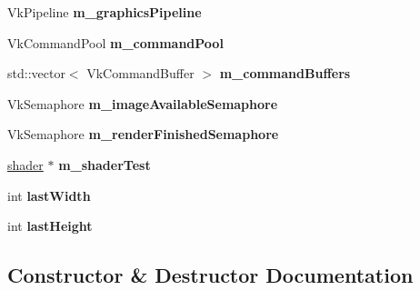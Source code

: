 \begin{DoxyCompactItemize}
\item 
\mbox{\label{classflounder_1_1renderer_a854dc575c2adf3a0f769d1945c7dbde5}} 
Vk\+Pipeline {\bfseries m\+\_\+graphics\+Pipeline}
\item 
\mbox{\label{classflounder_1_1renderer_aa7064e58cdca2627dfea4eb807c0a8b8}} 
Vk\+Command\+Pool {\bfseries m\+\_\+command\+Pool}
\item 
\mbox{\label{classflounder_1_1renderer_a1b4a42cf9601b7c5085d2f00ac73f4ab}} 
std\+::vector$<$ Vk\+Command\+Buffer $>$ {\bfseries m\+\_\+command\+Buffers}
\item 
\mbox{\label{classflounder_1_1renderer_ad3b52f84bf8fe96ec62cd472216028b5}} 
Vk\+Semaphore {\bfseries m\+\_\+image\+Available\+Semaphore}
\item 
\mbox{\label{classflounder_1_1renderer_a925acf30368726785fa77d88615bdfb7}} 
Vk\+Semaphore {\bfseries m\+\_\+render\+Finished\+Semaphore}
\item 
\mbox{\label{classflounder_1_1renderer_a5a982cf34c6430668c769ee3865d5e54}} 
\hyperlink{classflounder_1_1shader}{shader} $\ast$ {\bfseries m\+\_\+shader\+Test}
\item 
\mbox{\label{classflounder_1_1renderer_a837d3525440f0cd0da1a2478f9fa2475}} 
int {\bfseries last\+Width}
\item 
\mbox{\label{classflounder_1_1renderer_acdac3ce608a50f7eecd6c78f35c33ba9}} 
int {\bfseries last\+Height}
\end{DoxyCompactItemize}


\subsection{Constructor \& Destructor Documentation}
\mbox{\label{classflounder_1_1renderer_ade56bfb3db7dca6ac41f4bc78c0ab35b}} 

